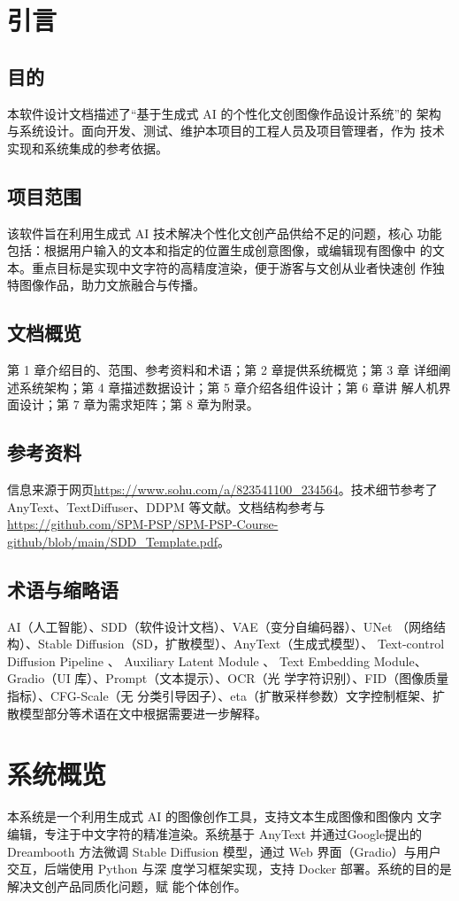 \documentclass[a4paper,12pt]{article}
\begin{document}

\makecover

\tableofcontents
\clearpage

\section{引言}
\subsection{目的}
本软件设计文档描述了“基于生成式 AI 的个性化文创图像作品设计系统”的
架构与系统设计。面向开发、测试、维护本项目的工程人员及项目管理者，作为
技术实现和系统集成的参考依据。
\subsection{项目范围}
该软件旨在利用生成式 AI 技术解决个性化文创产品供给不足的问题，核心
功能包括：根据用户输入的文本和指定的位置生成创意图像，或编辑现有图像中
的文本。重点目标是实现中文字符的高精度渲染，便于游客与文创从业者快速创
作独特图像作品，助力文旅融合与传播。
\subsection{文档概览}
第 1 章介绍目的、范围、参考资料和术语；第 2 章提供系统概览；第 3 章
详细阐述系统架构；第 4 章描述数据设计；第 5 章介绍各组件设计；第 6 章讲
解人机界面设计；第 7 章为需求矩阵；第 8 章为附录。
\subsection{参考资料}
信息来源于网页\url{https://www.sohu.com/a/823541100_234564}。技术细节参考了
AnyText、TextDiffuser、DDPM 等文献。文档结构参考与\url{https://github.com/SPM-PSP/SPM-PSP-Course-github/blob/main/SDD_Template.pdf}。
\subsection{术语与缩略语}
AI（人工智能）、SDD（软件设计文档）、VAE（变分自编码器）、UNet
（网络结构）、Stable Diffusion（SD，扩散模型）、AnyText（生成式模型）、
Text-control Diffusion Pipeline 、 Auxiliary Latent Module 、 Text Embedding
Module、Gradio（UI 库）、Prompt（文本提示）、OCR（光
学字符识别）、FID（图像质量指标）、CFG-Scale（无
分类引导因子）、eta（扩散采样参数）文字控制框架、扩散模型部分等术语在文中根据需要进一步解释。

\section{系统概览}
本系统是一个利用生成式 AI 的图像创作工具，支持文本生成图像和图像内
文字编辑，专注于中文字符的精准渲染。系统基于 AnyText 并通过Google提出的Dreambooth
方法微调 Stable
Diffusion 模型，通过 Web 界面（Gradio）与用户交互，后端使用 Python 与深
度学习框架实现，支持 Docker 部署。系统的目的是解决文创产品同质化问题，赋
能个体创作。
\end{document}
